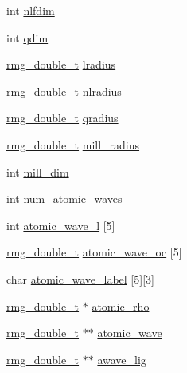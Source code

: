 \begin{DoxyCompactItemize}
\item 
int \hyperlink{struct_s_p_e_c_i_e_s_aca2a908cb511e23c7337b49eefa49bcf}{nlfdim}
\item 
int \hyperlink{struct_s_p_e_c_i_e_s_a51d948338eca077d974124750e3de313}{qdim}
\item 
\hyperlink{rmgtypes_8h_aaa16921c14f121c56eaa42390a340db8}{rmg\-\_\-double\-\_\-t} \hyperlink{struct_s_p_e_c_i_e_s_ada1c4a74e9c5d4d3d20ae36a2ce1ca0f}{lradius}
\item 
\hyperlink{rmgtypes_8h_aaa16921c14f121c56eaa42390a340db8}{rmg\-\_\-double\-\_\-t} \hyperlink{struct_s_p_e_c_i_e_s_af1d4b65d6475193ea4f82f866442d658}{nlradius}
\item 
\hyperlink{rmgtypes_8h_aaa16921c14f121c56eaa42390a340db8}{rmg\-\_\-double\-\_\-t} \hyperlink{struct_s_p_e_c_i_e_s_acd6d1a0bc9edb607d871651b79596cf4}{qradius}
\item 
\hyperlink{rmgtypes_8h_aaa16921c14f121c56eaa42390a340db8}{rmg\-\_\-double\-\_\-t} \hyperlink{struct_s_p_e_c_i_e_s_a4ad3eeb2f87c77964abd1e11bf5299ec}{mill\-\_\-radius}
\item 
int \hyperlink{struct_s_p_e_c_i_e_s_adaff1d86f393d9bc8d4101ac1d3946a7}{mill\-\_\-dim}
\item 
int \hyperlink{struct_s_p_e_c_i_e_s_ad6e6fa1b573b6d4950a2e6b887e5231d}{num\-\_\-atomic\-\_\-waves}
\item 
int \hyperlink{struct_s_p_e_c_i_e_s_a1482c7ac706335f7fc0cecce0d90cbf2}{atomic\-\_\-wave\-\_\-l} \mbox{[}5\mbox{]}
\item 
\hyperlink{rmgtypes_8h_aaa16921c14f121c56eaa42390a340db8}{rmg\-\_\-double\-\_\-t} \hyperlink{struct_s_p_e_c_i_e_s_a2f5e695e8c0e07c4cf156dce4e83d692}{atomic\-\_\-wave\-\_\-oc} \mbox{[}5\mbox{]}
\item 
char \hyperlink{struct_s_p_e_c_i_e_s_a792465639520e8f12ba9116ad9885815}{atomic\-\_\-wave\-\_\-label} \mbox{[}5\mbox{]}\mbox{[}3\mbox{]}
\item 
\hyperlink{rmgtypes_8h_aaa16921c14f121c56eaa42390a340db8}{rmg\-\_\-double\-\_\-t} $\ast$ \hyperlink{struct_s_p_e_c_i_e_s_a464bfa9bdad6e45d59e1dc8084acab12}{atomic\-\_\-rho}
\item 
\hyperlink{rmgtypes_8h_aaa16921c14f121c56eaa42390a340db8}{rmg\-\_\-double\-\_\-t} $\ast$$\ast$ \hyperlink{struct_s_p_e_c_i_e_s_ae85c96ec13cfc3a6996edbf31de3e6ee}{atomic\-\_\-wave}
\item 
\hyperlink{rmgtypes_8h_aaa16921c14f121c56eaa42390a340db8}{rmg\-\_\-double\-\_\-t} $\ast$$\ast$ \hyperlink{struct_s_p_e_c_i_e_s_a07cfd18b8491a583237a3b25c5bcc23c}{awave\-\_\-lig}

\end{DoxyCompactItemize}
